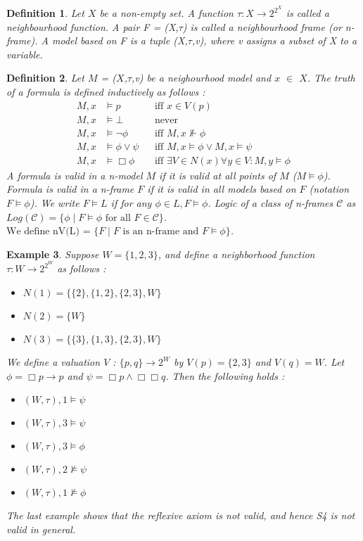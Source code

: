 \documentclass[12pt, a4paper]{scrartcl}
\newtheorem{definition}{Definition}[subsection]
\newtheorem{example}[definition]{Example}
\begin{document}
\begin{definition}
    Let $X$ be a non-empty set. A function  $\tau : X \rightarrow 2^{2^X}$ is called a neighbourhood function. A pair 
    F = (X,$\tau$) is called a neighbourhood frame (or n-frame). A model based on F is a tuple (X,$\tau$,v), where v assigns a subset of X to a variable.
        
\end{definition}

\begin{definition}
    Let $M$ = ($X$,$\tau$,v) be a neighourhood model and $x$ $\in$ $X$. The truth of a formula is defined inductively as follows :
    \begin{align*}
        M,x &\vDash p &&\text{iff } x \in V(p)\\
        M,x &\vDash \bot &&\text{never } \\
        M,x &\vDash \neg \phi &&\text{iff } M,x \nVdash \phi\\
        M,x &\vDash \phi \lor \psi &&\text{iff } M,x \vDash \phi \lor M,x \vDash \psi\\
        M,x &\vDash \Box \phi &&\text{iff } \exists V \in N(x) \forall y \in V : M,y \models \phi
    \end{align*}
    A formula is valid in a n-model $M$ if it is valid at all points of $M$ ($M \vDash \phi$). Formula is valid in a n-frame $F$ if it is valid in
    all models based on $F$ (notation $F \vDash \phi$). We write $F \vDash L$ if for any $\phi \in L, F \vDash \phi$. Logic of a class of n-frames $\mathcal{C}$ as $Log(\mathcal{C}) = \{\phi \mid F \vDash \phi \mbox{ for all } F \in \mathcal{C}\}$.
    $\mbox{We define nV(L) =  } \{ F \mid F \mbox{ is an n-frame and } F \models \phi \}$.
\end{definition}

\begin{example}
    Suppose $W = \{1,2,3\}$, and define a neighborhood function $\tau : W \rightarrow 2^{2^W}$ as follows :
    \begin{itemize}
        \item $N(1) = \{\{2\}, \{1,2\}, \{2,3\}, W\}$
        \item $N(2) = \{W\}$
        \item $N(3) = \{\{3\}, \{1,3\}, \{2,3\}, W\}$
    \end{itemize}
    We define a valuation $V$ : $\{p,q\} \rightarrow 2^W$ by $V(p) = \{2,3\}$ and $V(q) = W$.
    Let $\phi = \Box p \rightarrow p$ and $\psi = \Box p \land \Box\Box q$. Then the following holds :
    \begin{itemize}
        \item $(W,\tau),1 \vDash \psi$
        \item $(W,\tau),3 \vDash \psi$
        \item $(W,\tau),3 \vDash \phi$
        \item $(W,\tau),2 \nvDash \psi$
        \item $(W,\tau),1 \nvDash \phi$
    \end{itemize}
    The last example shows that the reflexive axiom is not valid, and hence S4 is not valid in general.
\end{example}
\end{document}
